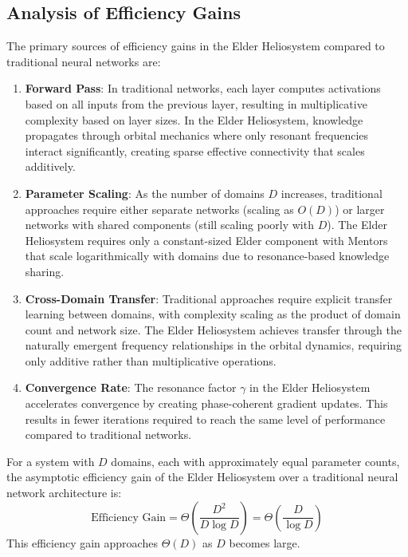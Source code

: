\subsection{Analysis of Efficiency Gains}

The primary sources of efficiency gains in the Elder Heliosystem compared to traditional neural networks are:

\begin{enumerate}
    \item \textbf{Forward Pass}: In traditional networks, each layer computes activations based on all inputs from the previous layer, resulting in multiplicative complexity based on layer sizes. In the Elder Heliosystem, knowledge propagates through orbital mechanics where only resonant frequencies interact significantly, creating sparse effective connectivity that scales additively.
    
    \item \textbf{Parameter Scaling}: As the number of domains $D$ increases, traditional approaches require either separate networks (scaling as $O(D)$) or larger networks with shared components (still scaling poorly with $D$). The Elder Heliosystem requires only a constant-sized Elder component with Mentors that scale logarithmically with domains due to resonance-based knowledge sharing.
    
    \item \textbf{Cross-Domain Transfer}: Traditional approaches require explicit transfer learning between domains, with complexity scaling as the product of domain count and network size. The Elder Heliosystem achieves transfer through the naturally emergent frequency relationships in the orbital dynamics, requiring only additive rather than multiplicative operations.
    
    \item \textbf{Convergence Rate}: The resonance factor $\gamma$ in the Elder Heliosystem accelerates convergence by creating phase-coherent gradient updates. This results in fewer iterations required to reach the same level of performance compared to traditional networks.
\end{enumerate}

\begin{theorem}
For a system with $D$ domains, each with approximately equal parameter counts, the asymptotic efficiency gain of the Elder Heliosystem over a traditional neural network architecture is:
\begin{equation}
\text{Efficiency Gain} = \Theta\left(\frac{D^2}{D \log D}\right) = \Theta\left(\frac{D}{\log D}\right)
\end{equation}
This efficiency gain approaches $\Theta(D)$ as $D$ becomes large.
\end{theorem}

